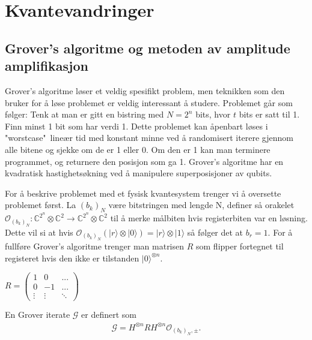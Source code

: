 \section{Kvantevandringer}

\subsection{Grover's algoritme og metoden av amplitude amplifikasjon}

    Grover's algoritme løser et veldig spesifikt problem, men teknikken som den bruker for å løse problemet er veldig interessant å studere. Problemet går som følger: Tenk at man er gitt en bistring med $N=2^n$ bits, hvor $t$ bits er satt til 1. Finn minst 1 bit som har verdi 1. Dette problemet kan åpenbart løses i "worstcase"\ lineær tid med konstant minne ved å randomisert iterere gjennom alle bitene og sjekke om de er 1 eller 0. Om den er 1 kan man terminere programmet, og returnere den posisjon som ga 1. Grover's algoritme har en kvadratisk hastighetsøkning ved å manipulere superposisjoner av qubits.

    For å beskrive problemet med et fysisk kvantesystem trenger vi å oversette problemet først. La $(b_k)_N$ være bitstringen med lengde N, definer så orakelet $\mathcal{O}_{(b_k)_N}:\mathbb{C}^{2^n} \otimes \mathbb{C}^2 \rightarrow \mathbb{C}^{2^n} \otimes \mathbb{C}^2$ til å merke målbiten hvis registerbiten var en løsning. Dette vil si at hvis $\mathcal{O}_{(b_k)_N}(|r\rangle\otimes |0\rangle) = |r\rangle\otimes |1\rangle$ så følger det at $b_r = 1$. For å fullføre Grover's algoritme trenger man matrisen $R$ som flipper fortegnet til registeret hvis den ikke er tilstanden $|0\rangle^{\otimes n}$.
    \begin{center}
        \begin{math}
            R = \begin{pmatrix}
                1 & 0 & ... \\
                0 & -1 & ... \\
                \vdots & \vdots & \ddots
            \end{pmatrix}
        \end{math}
    \end{center}

    En Grover iterate $\mathcal{G}$ er definert som 
    \begin{align*}
        \mathcal{G}=H^{\otimes n}RH^{\otimes n}\mathcal{O}_{(b_k)_N, \pm}.
    \end{align*}
    
